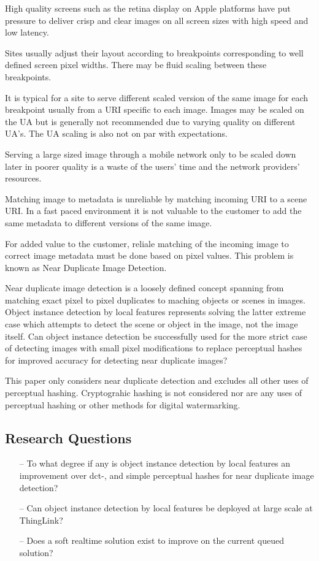 \documentclass[english,12pt,a4paper,pdftex,elec,utf8]{aaltothesis}
\begin{document}
High quality screens such as the retina display on Apple platforms have put pressure to deliver crisp and clear images on all screen sizes with high speed and low latency.

Sites usually adjust their layout according to breakpoints corresponding to well defined screen pixel widths. There may be fluid scaling between these breakpoints.

It is typical for a site to serve different scaled version of the same image for each breakpoint usually from a URI specific to each image. Images may be scaled on the UA but is generally not recommended due to varying quality on different UA's. The UA scaling is also not on par with expectations.

Serving a large sized image through a mobile network only to be scaled down later in poorer quality is a waste of the users' time and the network providers' resources.

Matching image to metadata is unreliable by matching incoming URI to a scene URI. In a fast paced environment it is not valuable to the customer to add the same metadata to different versions of the same image.

For added value to the customer, reliale matching of the incoming image to correct image metadata must be done based on pixel values. This problem is known as Near Duplicate Image Detection.

Near duplicate image detection is a loosely defined concept spanning from matching exact pixel to pixel duplicates to maching objects or scenes in images. Object instance detection by local features represents solving the latter extreme case which attempts to detect the scene or object in the image, not the image itself. Can object instance detection be successfully used for the more strict case of detecting images with small pixel modifications to replace perceptual hashes for improved accuracy for detecting near duplicate images?

This paper only considers near duplicate detection and excludes all other uses of perceptual hashing. Cryptograhic hashing is not considered nor are any uses of perceptual hashing or other methods for digital watermarking.

\subsection{Research Questions}
\begin{itemize}
\item[--] To what degree if any is object instance detection by local features an improvement over dct-, and simple perceptual hashes for near duplicate image detection?
\item[--] Can object instance detection by local features be deployed at large scale at ThingLink?
\item[--] Does a soft realtime solution exist to improve on the current queued solution?
\end{itemize}
\end{document}
